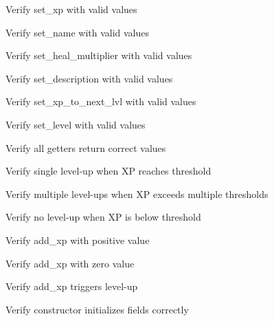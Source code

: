 \begin{DoxyRefList}
\label{test__test000042}%
%
Verify set\+\_\+xp with valid values  



\label{test__test000044}%
%
Verify set\+\_\+name with valid values  



\label{test__test000046}%
%
Verify set\+\_\+heal\+\_\+multiplier with valid values  



\label{test__test000048}%
%
Verify set\+\_\+description with valid values  



\label{test__test000050}%
%
Verify set\+\_\+xp\+\_\+to\+\_\+next\+\_\+lvl with valid values  



\label{test__test000052}%
%
Verify set\+\_\+level with valid values  



\label{test__test000054}%
%
Verify all getters return correct values  



\label{test__test000055}%
%
Verify single level-\/up when XP reaches threshold  



\label{test__test000056}%
%
Verify multiple level-\/ups when XP exceeds multiple thresholds  



\label{test__test000057}%
%
Verify no level-\/up when XP is below threshold  



\label{test__test000058}%
%
Verify add\+\_\+xp with positive value  



\label{test__test000059}%
%
Verify add\+\_\+xp with zero value  



\label{test__test000061}%
%
Verify add\+\_\+xp triggers level-\/up  



\label{test__test000062}%
%
Verify  constructor initializes fields correctly  




\end{DoxyRefList}
